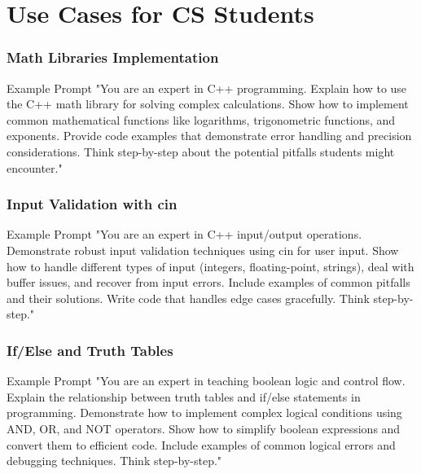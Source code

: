 \documentclass{beamer}
\begin{document}
\section{Use Cases for CS Students}
\frame{\sectionpage}
\begin{frame}
\frametitle{Math Libraries Implementation}
\begin{exampleblock}{Example Prompt}
"You are an expert in C++ programming. Explain how to use the C++ math library for solving complex calculations. Show how to implement common mathematical functions like logarithms, trigonometric functions, and exponents. Provide code examples that demonstrate error handling and precision considerations. Think step-by-step about the potential pitfalls students might encounter."
\end{exampleblock}
\end{frame}

\begin{frame}
\frametitle{Input Validation with cin}
\begin{exampleblock}{Example Prompt}
"You are an expert in C++ input/output operations. Demonstrate robust input validation techniques using cin for user input. Show how to handle different types of input (integers, floating-point, strings), deal with buffer issues, and recover from input errors. Include examples of common pitfalls and their solutions. Write code that handles edge cases gracefully. Think step-by-step."
\end{exampleblock}
\end{frame}

\begin{frame}
\frametitle{If/Else and Truth Tables}
\begin{exampleblock}{Example Prompt}
"You are an expert in teaching boolean logic and control flow. Explain the relationship between truth tables and if/else statements in programming. Demonstrate how to implement complex logical conditions using AND, OR, and NOT operators. Show how to simplify boolean expressions and convert them to efficient code. Include examples of common logical errors and debugging techniques. Think step-by-step."
\end{exampleblock}
\end{frame}
\end{document}
